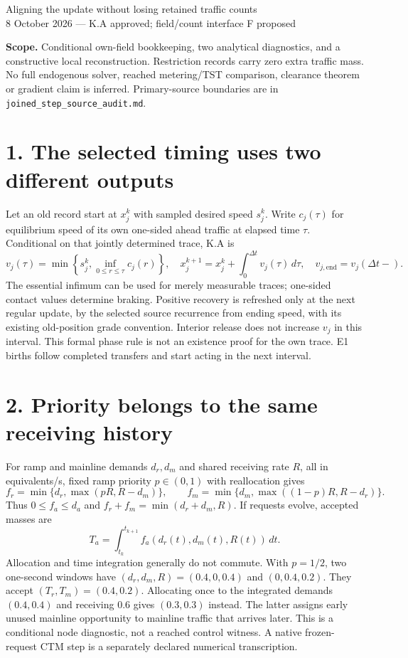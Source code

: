\documentclass[11pt,a4paper]{article}
\begin{document}
{\Large Aligning the update without losing retained traffic counts}\\[4pt]
8 October 2026 --- K.A approved; field/count interface F proposed

\textbf{Scope.} Conditional own-field bookkeeping, two analytical diagnostics,
and a constructive local reconstruction. Restriction records carry zero extra
traffic mass. No full endogenous solver, reached metering/TST comparison,
clearance theorem or gradient claim is inferred. Primary-source boundaries
are in \texttt{joined\_step\_source\_audit.md}.

\section*{1. The selected timing uses two different outputs}
Let an old record start at $x_j^k$ with sampled desired speed $s_j^k$.
Write $c_j(\tau)$ for equilibrium speed of its own one-sided ahead traffic
at elapsed time $\tau$. Conditional on that jointly determined trace, K.A is
\begin{equation}
 v_j(\tau)=\min\left\{s_j^k,\inf_{0\le r\le\tau}c_j(r)\right\},\quad
 x_j^{k+1}=x_j^k+\int_0^{\Delta t}v_j(\tau)\,d\tau,\quad
 v_{j,\mathrm{end}}=v_j(\Delta t-).
\end{equation}
The essential infimum can be used for merely measurable traces; one-sided
contact values determine braking. Positive recovery is refreshed only at the
next regular update, by the selected source recurrence from ending speed,
with its existing old-position grade convention. Interior release does not
increase $v_j$ in this interval. This formal phase rule is not an existence
proof for the own trace. E1 births follow completed transfers and start acting
in the next interval.

\section*{2. Priority belongs to the same receiving history}
For ramp and mainline demands $d_r,d_m$ and shared receiving rate $R$, all in
equivalents/s, fixed ramp priority $p\in(0,1)$ with reallocation gives
\begin{equation}
 f_r=\min\{d_r,\max(pR,R-d_m)\},\qquad
 f_m=\min\{d_m,\max((1-p)R,R-d_r)\}.
\end{equation}
Thus $0\le f_a\le d_a$ and $f_r+f_m=\min(d_r+d_m,R)$. If requests evolve,
accepted masses are
\begin{equation}
 T_a=\int_{t_k}^{t_{k+1}} f_a(d_r(t),d_m(t),R(t))\,dt.
\end{equation}
Allocation and time integration generally do not commute. With $p=1/2$,
two one-second windows have $(d_r,d_m,R)=(0.4,0,0.4)$ and $(0,0.4,0.2)$.
They accept $(T_r,T_m)=(0.4,0.2)$. Allocating once to the integrated demands
$(0.4,0.4)$ and receiving $0.6$ gives $(0.3,0.3)$ instead. The latter assigns
early unused mainline opportunity to mainline traffic that arrives later.
This is a conditional node diagnostic, not a reached control witness. A native
frozen-request CTM step is a separately declared numerical transcription.
\end{document}

